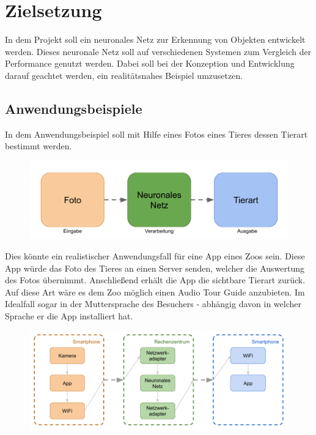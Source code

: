 

\section{Zielsetzung}

In dem Projekt soll ein neuronales Netz zur Erkennung von Objekten entwickelt werden. Dieses neuronale Netz soll auf verschiedenen Systemen zum Vergleich der Performance genutzt werden. Dabei soll bei der Konzeption und Entwicklung darauf geachtet werden, ein realitätsnahes Beispiel umzusetzen.



\subsection{Anwendungsbeispiele}

In dem Anwendungsbeispiel soll mit Hilfe eines Fotos eines Tieres dessen Tierart bestimmt werden. 

\begin{figure}[htbp]
	\centering
		\includegraphics[width=1.00\textwidth]{BilderPDF/zielsetzung/Prinzip.png}
	\label{fig:Prinzip}
\end{figure}

Dies könnte ein realistischer Anwendungsfall für eine App eines Zoos sein. Diese App würde das Foto des Tieres an einen Server senden, welcher die Auswertung des Fotos übernimmt. Anschließend erhält die App die sichtbare Tierart zurück. Auf diese Art wäre es dem Zoo  möglich einen Audio Tour Guide anzubieten. Im Idealfall sogar in der Muttersprache des Besuchers - abhängig davon in welcher Sprache er die App installiert hat. 

\begin{figure}[htbp]
	\centering
		\includegraphics[width=1.00\textwidth]{BilderPDF/zielsetzung/App.png}
	\label{fig:App}
\end{figure}

